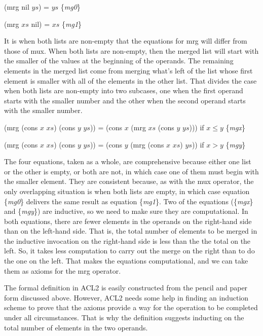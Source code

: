 \hspace{1cm} (mrg nil $ys$) = $ys$ \hfill \{\emph{mg0}\}

\hspace{1cm} (mrg $xs$ nil) = $xs$ \hfill \{\emph{mg1}\}

It is when both lists are non-empty that the equations for mrg
will differ from those of mux.
When both lists are non-empty, then the merged list will
start with the smaller of the values at the beginning of the operands.
The remaining elements in the merged list come from
merging what's left of the list whose first element is smaller
with all of the elements in the other list.
That divides the case when both lists are non-empty into two
subcases, one when the first operand starts with the smaller number
and the other when the second operand starts with the smaller number.

\hspace{1cm} (mrg (cons $x$ $xs$) (cons $y$ $ys$)) = (cons $x$ (mrg $xs$ (cons $y$ $ys$))) if $x \le y$ \hfill \{\emph{mgx}\}

\hspace{1cm} (mrg (cons $x$ $xs$) (cons $y$ $ys$)) = (cons $y$ (mrg (cons $x$ $xs$) $ys$)) if $x > y$  \hfill \{\emph{mgy}\}

The four equations, taken as a whole, are comprehensive because either one list or the other is empty,
or both are not, in which case one of them must begin with the smaller element.
They are consistent because, as with the mux operator, the only overlapping situation is when
both lists are empty, in which case equation \{\emph{mg0}\}
delivers the same result as equation \{\emph{mg1}\}.
Two of the equations (\{\emph{mgx}\} and \{\emph{mgy}\}) are inductive,
so we need to make sure they are computational.
In both equations, there are fewer elements in the operands
on the right-hand side than on the left-hand side.
That is, the total number of elements to be merged in the inductive invocation
on the right-hand side is less than the the total on the left.
So, it takes less computation to carry out the merge on the right
than to do the one on the left.
That makes the equations computational,
and we can take them as axioms for the mrg operator.

The formal definition in ACL2 is easily constructed from
the pencil and paper form discussed above.
However, ACL2 needs some help in finding an induction scheme
to prove that the axioms provide a way for the operation to
be completed under all circumstances.
That is why the definition suggests
inducting on the total number of elements in the two operands.


